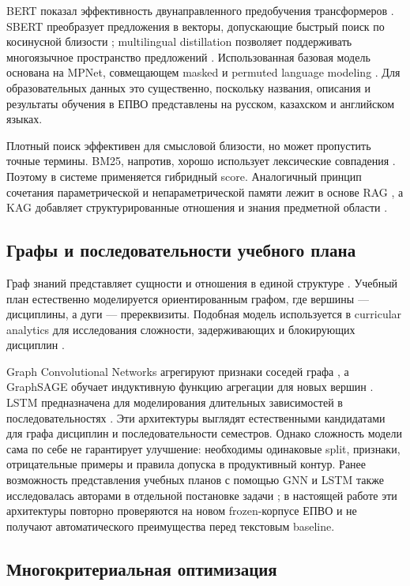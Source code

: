 \documentclass[twoside,11pt]{article}
\begin{document}
BERT показал эффективность двунаправленного предобучения трансформеров \cite{Devlin2019}. SBERT преобразует предложения в векторы, допускающие быстрый поиск по косинусной близости \cite{Reimers2019}; multilingual distillation позволяет поддерживать многоязычное пространство предложений \cite{Reimers2020}. Использованная базовая модель основана на MPNet, совмещающем masked и permuted language modeling \cite{Song2020}. Для образовательных данных это существенно, поскольку названия, описания и результаты обучения в ЕПВО представлены на русском, казахском и английском языках.

Плотный поиск эффективен для смысловой близости, но может пропустить точные термины. BM25, напротив, хорошо использует лексические совпадения \cite{Robertson2009}. Поэтому в системе применяется гибридный score. Аналогичный принцип сочетания параметрической и непараметрической памяти лежит в основе RAG \cite{Lewis2020}, а KAG добавляет структурированные отношения и знания предметной области \cite{Liang2024}.

\subsection{Графы и последовательности учебного плана}

Граф знаний представляет сущности и отношения в единой структуре \cite{Hogan2021}. Учебный план естественно моделируется ориентированным графом, где вершины --- дисциплины, а дуги --- пререквизиты. Подобная модель используется в curricular analytics для исследования сложности, задерживающих и блокирующих дисциплин \cite{Heileman2018}.

Graph Convolutional Networks агрегируют признаки соседей графа \cite{Kipf2017}, а GraphSAGE обучает индуктивную функцию агрегации для новых вершин \cite{Hamilton2017}. LSTM предназначена для моделирования длительных зависимостей в последовательностях \cite{Hochreiter1997}. Эти архитектуры выглядят естественными кандидатами для графа дисциплин и последовательности семестров. Однако сложность модели сама по себе не гарантирует улучшение: необходимы одинаковые split, признаки, отрицательные примеры и правила допуска в продуктивный контур.
Ранее возможность представления учебных планов с помощью GNN и LSTM также исследовалась авторами в отдельной постановке задачи \cite{Kozhanov2025}; в настоящей работе эти архитектуры повторно проверяются на новом frozen-корпусе ЕПВО и не получают автоматического преимущества перед текстовым baseline.

\subsection{Многокритериальная оптимизация}
\end{document}

